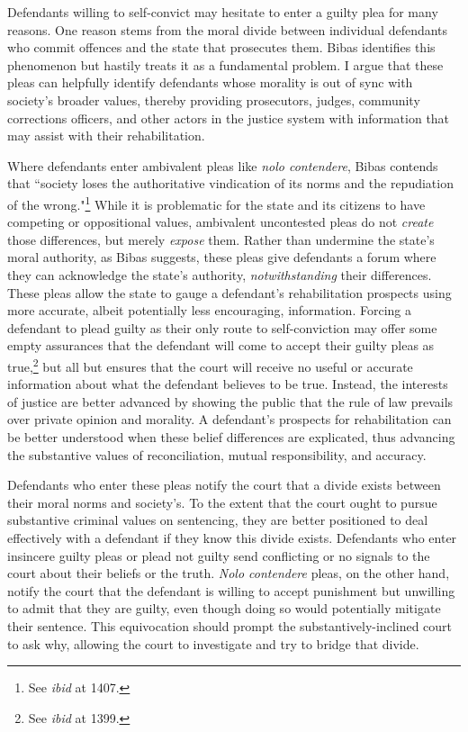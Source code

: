Defendants willing to self-convict may hesitate to enter a guilty plea for many reasons. One reason stems from the moral divide between individual defendants who commit offences and the state that prosecutes them. Bibas identifies this phenomenon but hastily treats it as a fundamental problem. I argue that these pleas can helpfully identify defendants whose morality is out of sync with society's broader values, thereby providing prosecutors, judges, community corrections officers, and other actors in the justice system with information that may assist with their rehabilitation.

Where defendants enter ambivalent pleas like \textit{nolo contendere}, Bibas contends that ``society loses the authoritative vindication of its norms and the repudiation of the wrong."\footnote{See \textit{ibid} at 1407.} While it is problematic for the state and its citizens to have competing or oppositional values, ambivalent uncontested pleas do not \textit{create} those differences, but merely \textit{expose} them. Rather than undermine the state's moral authority, as Bibas suggests, these pleas give defendants a forum where they can acknowledge the state's authority, \textit{notwithstanding} their differences. These pleas allow the state to gauge a defendant's rehabilitation prospects using more accurate, albeit potentially less encouraging, information. Forcing a defendant to plead guilty as their only route to self-conviction may offer some empty assurances that the defendant will come to accept their guilty pleas as true,\footnote{See \textit{ibid} at 1399.} but all but ensures that the court will receive no useful or accurate information about what the defendant believes to be true. Instead, the interests of justice are better advanced by showing the public that the rule of law prevails over private opinion and morality. A defendant's prospects for rehabilitation can be better understood when these belief differences are explicated, thus advancing the substantive values of reconciliation, mutual responsibility, and accuracy.

Defendants who enter these pleas notify the court that a divide exists between their moral norms and society's. To the extent that the court ought to pursue substantive criminal values on sentencing, they are better positioned to deal effectively with a defendant if they know this divide exists. Defendants who enter insincere guilty pleas or plead not guilty send conflicting or no signals to the court about their beliefs or the truth. \textit{Nolo contendere} pleas, on the other hand, notify the court that the defendant is willing to accept punishment but unwilling to admit that they are guilty, even though doing so would potentially mitigate their sentence. This equivocation should prompt the substantively-inclined court to ask why, allowing the court to investigate and try to bridge that divide. 

